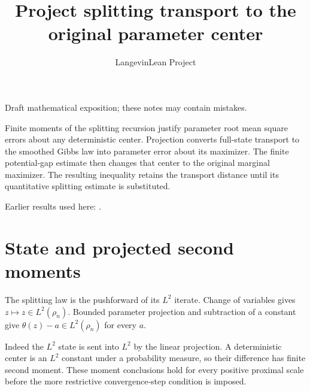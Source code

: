 \documentclass[11pt,a4paper]{article}
\title{\texorpdfstring{Project splitting transport to the original parameter center}{Project splitting transport to the original parameter center}}
\author{LangevinLean Project}
\date{}
\begin{document}
\maketitle
Draft mathematical exposition; these notes may contain mistakes.


Finite moments of the splitting recursion justify parameter root mean square errors about any deterministic center. Projection converts full-state transport to the smoothed Gibbs law into parameter error about its maximizer. The finite potential-gap estimate then changes that center to the original marginal maximizer. The resulting inequality retains the transport distance until its quantitative splitting estimate is substituted.




Earlier results used here: \cite[Section~3.21]{LangevinLean2026ULASC}.

\section{\texorpdfstring{State and projected second moments}{State and projected second moments}}


The splitting law is the pushforward of its \(L^2\) iterate. Change of variables gives \(z\mapsto z\in L^2(\rho_n)\). Bounded parameter projection and subtraction of a constant give \(\theta(z)-a\in L^2(\rho_n)\) for every \(a\).



Indeed the \(L^2\) state is sent into \(L^2\) by the linear projection. A deterministic center is an \(L^2\) constant under a probability measure, so their difference has finite second moment. These moment conclusions hold for every positive proximal scale before the more restrictive convergence-step condition is imposed.
\end{document}
